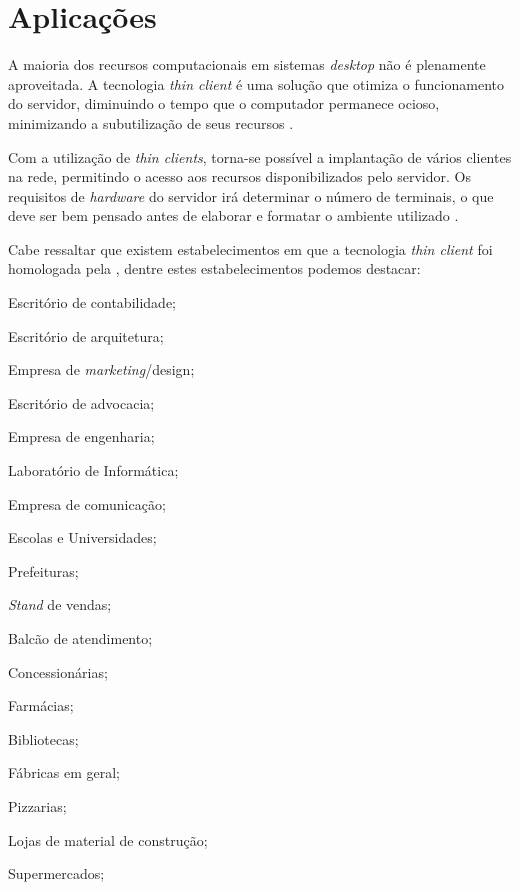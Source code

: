\documentclass[
	12pt,				%
	openright,			%
	twoside,			%
	a4paper,			%
	chapter=TITLE,		%
	english,			%
	brazil				%
	]{abntex2}
\begin{document}
\newpage







\section{Aplicações}

A maioria dos recursos computacionais em sistemas \textit{desktop} não é plenamente aproveitada. A tecnologia \textit{thin client} é uma solução que otimiza o funcionamento do servidor, diminuindo o tempo que o computador permanece ocioso, minimizando a subutilização de seus recursos \cite{thinclientbrasil}. 

Com a utilização de \textit{thin clients}, torna-se possível a implantação de vários clientes na rede, permitindo o acesso aos recursos disponibilizados pelo servidor. Os requisitos de \textit{hardware} do servidor irá determinar o número de terminais, o que deve ser bem pensado antes de elaborar e formatar o ambiente utilizado \cite{thinclientbrasil}. 

Cabe ressaltar que existem estabelecimentos em que a tecnologia \textit{thin client} foi homologada pela , dentre estes estabelecimentos podemos destacar:


\begin{alineas}
\item Escritório de contabilidade;
\item Escritório de arquitetura;
\item Empresa de \textit{marketing}/design;
\item Escritório de advocacia;
\item Empresa de engenharia;
\item Laboratório de Informática;
\item Empresa de comunicação;
\item Escolas e Universidades;
\item Prefeituras;
\item \textit{Stand} de vendas;
\item Balcão de atendimento;
\item Concessionárias;
\item Farmácias;
\item Bibliotecas;
\item Fábricas em geral;
\item Pizzarias;
\item Lojas de material de construção;
\item Supermercados;
\end{alineas}
\end{document}
